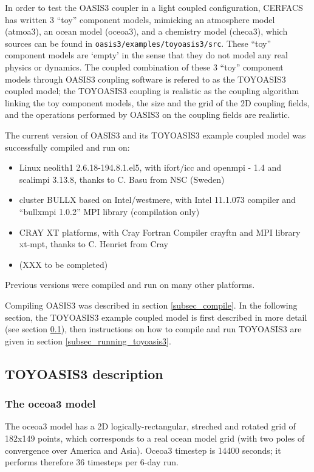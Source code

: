 In order to test the OASIS3 coupler in a light coupled configuration,
CERFACS has written 3 ``toy'' component models, mimicking an
atmosphere model (atmoa3), an ocean model (oceoa3), and a
chemistry model (cheoa3), which sources can be found in
{\tt oasis3/examples/toyoasis3/src}. These ``toy'' component models
are `empty' in the sense that they do not model any real physics or
dynamics. The coupled combination of these 3 ``toy'' component models
through OASIS3 coupling software is refered to as the TOYOASIS3 coupled
model; the TOYOASIS3 coupling is realistic as the coupling algorithm
linking the toy component models, the size and the grid of the
2D coupling fields, and the operations performed by
OASIS3 on the coupling fields are realistic.

The current version of OASIS3 and its TOYOASIS3 example coupled model
was successfully compiled and run on:
\begin{itemize}
\item Linux neolith1 2.6.18-194.8.1.el5, with ifort/icc and openmpi -
  1.4 and scalimpi 3.13.8, thanks to C. Basu from NSC (Sweden)
\item cluster BULLX based on Intel/westmere, with Intel 11.1.073 compiler and ``bullxmpi 1.0.2'' MPI library (compilation only)
\item CRAY XT platforms, with Cray Fortran Compiler crayftn and MPI library xt-mpt, thanks to C. Henriet from Cray 
\item (XXX to be completed)
\end{itemize}
Previous versions were compiled and run on many other platforms.

Compiling OASIS3 was described in section \ref{subsec_compile}. In the
following section, the TOYOASIS3 example coupled model is first
described in more detail (see section \ref{subsec_toyoasis3}), then
instructions on how to compile and run TOYOASIS3 are given in section
\ref{subsec_running_toyoasis3}.

\subsection{TOYOASIS3 description}
\label{subsec_toyoasis3}

\subsubsection{The oceoa3 model}
\label{sec:oceoa3}

The oceoa3 model has a 2D logically-rectangular, streched
and rotated grid of 182x149 points, which corresponds to a real ocean
model grid (with two poles of convergence over America and Asia).
Oceoa3 timestep is 14400 seconds; it performs therefore 36 timesteps
per 6-day run.

